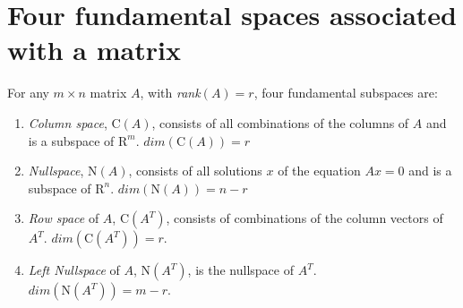 \documentclass{tufte-handout}
\theoremstyle{definition} \newtheorem{definition}{Definition}
\theoremstyle{remark} \newtheorem{remark}{Remark}
\begin{document}
\section{Four fundamental spaces associated with a matrix}
For any $m \times n$ matrix $A$, with \emph{rank}$(A) = r$, four
fundamental subspaces are:
\begin{enumerate}
\item \emph{Column space}, $\mathrm{C}(A)$, consists of all combinations
  of the columns of $A$ and is a subspace of $\mathrm{R}^m$.
  $dim(\mathrm{C}(A)) = r$
\item \emph{Nullspace}, $\mathrm{N}(A)$, consists of all solutions $x$
  of the equation $Ax = 0$ and is a subspace of $\mathrm{R}^n$.
  $dim(\mathrm{N}(A)) = n - r$
\item \emph{Row space} of $A$, $\mathrm{C}(A^T)$, consists of
  combinations of the column vectors of $A^T$.
  $dim(\mathrm{C}(A^T)) = r$.
\item \emph{Left Nullspace} of $A$, $\mathrm{N}(A^T)$, is the nullspace
  of $A^T$. $dim(\mathrm{N}(A^T)) = m - r$.
\end{enumerate}
\end{document}
